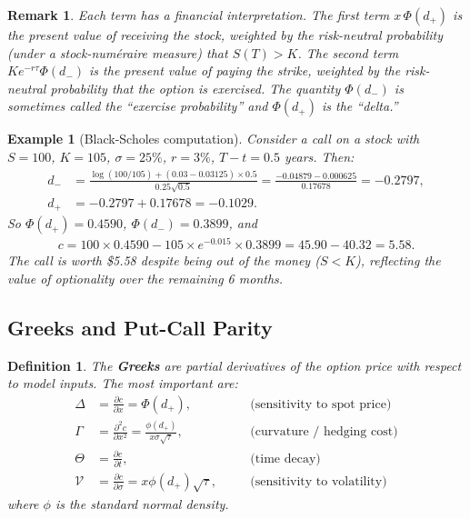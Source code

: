 \documentclass{report}
\theoremstyle{spacedplain}
\theoremstyle{spaceddefinition}
\newtheorem{definition}[theorem]{Definition}
\newtheorem{example}[theorem]{Example}
\theoremstyle{spacedremark}
\newtheorem{remark}[theorem]{Remark}
\begin{document}
\begin{remark}
Each term has a financial interpretation. The first term $x\,\Phi(d_+)$ is the present value of receiving the stock, weighted by the risk-neutral probability (under a stock-num\'eraire measure) that $S(T) > K$. The second term $Ke^{-r\tau}\Phi(d_-)$ is the present value of paying the strike, weighted by the risk-neutral probability that the option is exercised. The quantity $\Phi(d_-)$ is sometimes called the ``exercise probability'' and $\Phi(d_+)$ is the ``delta.''
\end{remark}

\begin{example}[Black-Scholes computation]
Consider a call on a stock with $S = 100$, $K = 105$, $\sigma = 25\%$, $r = 3\%$, $T - t = 0.5$ years. Then:
\begin{align}
    d_- &= \frac{\log(100/105) + (0.03 - 0.03125) \times 0.5}{0.25\sqrt{0.5}} = \frac{-0.04879 - 0.000625}{0.17678} = -0.2797, \\
    d_+ &= -0.2797 + 0.17678 = -0.1029.
\end{align}
So $\Phi(d_+) = 0.4590$, $\Phi(d_-) = 0.3899$, and
\begin{align}
    c = 100 \times 0.4590 - 105 \times e^{-0.015} \times 0.3899 = 45.90 - 40.32 = 5.58.
\end{align}
The call is worth \$5.58 despite being out of the money ($S < K$), reflecting the value of optionality over the remaining 6 months.
\end{example}


\subsection{Greeks and Put-Call Parity}

\begin{definition}
The \textbf{Greeks} are partial derivatives of the option price with respect to model inputs. The most important are:
\begin{align}
    \Delta &= \frac{\partial c}{\partial x} = \Phi(d_+), &\quad &\text{(sensitivity to spot price)} \\
    \Gamma &= \frac{\partial^2 c}{\partial x^2} = \frac{\phi(d_+)}{x\sigma\sqrt{\tau}}, &\quad &\text{(curvature / hedging cost)} \\
    \Theta &= \frac{\partial c}{\partial t}, &\quad &\text{(time decay)} \\
    \mathcal{V} &= \frac{\partial c}{\partial \sigma} = x\phi(d_+)\sqrt{\tau}, &\quad &\text{(sensitivity to volatility)}
\end{align}
where $\phi$ is the standard normal density.
\end{definition}
\end{document}
